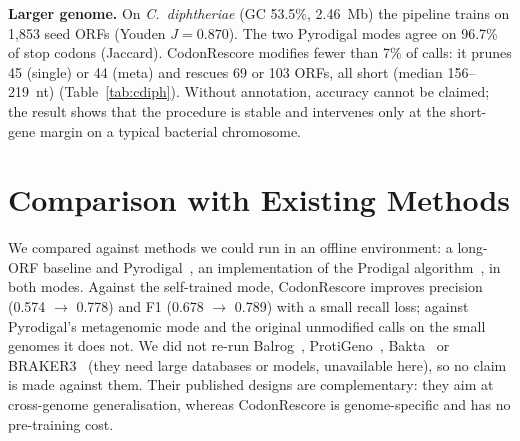 \begin{table}[t]
\caption{Threshold sensitivity (chloroplast).}\label{tab:sens}
\centering\footnotesize

\end{table}

\textbf{Larger genome.} On \textit{C.\ diphtheriae} (GC 53.5\%, 2.46~Mb) the pipeline trains on 1,853 seed ORFs (Youden $J=0.870$). The two Pyrodigal modes agree on 96.7\% of stop codons (Jaccard). CodonRescore modifies fewer than 7\% of calls: it prunes 45 (single) or 44 (meta) and rescues 69 or 103 ORFs, all short (median 156--219~nt) (Table~\ref{tab:cdiph}). Without annotation, accuracy cannot be claimed; the result shows that the procedure is stable and intervenes only at the short-gene margin on a typical bacterial chromosome.

\begin{table}[t]
\caption{CodonRescore on \textit{C.\ diphtheriae} NCTC11397 (no truth).}\label{tab:cdiph}
\centering\footnotesize
\resizebox{\linewidth}{!}{}
\end{table}

\section{Comparison with Existing Methods}
We compared against methods we could run in an offline environment: a long-ORF baseline and Pyrodigal~\cite{larralde2022}, an implementation of the Prodigal algorithm~\cite{hyatt2010}, in both modes. Against the self-trained mode, CodonRescore improves precision (0.574 $\rightarrow$ 0.778) and F1 (0.678 $\rightarrow$ 0.789) with a small recall loss; against Pyrodigal's metagenomic mode and the original unmodified calls on the small genomes it does not. We did not re-run Balrog~\cite{sommer2021}, ProtiGeno~\cite{tu2023}, Bakta~\cite{schwengers2021} or BRAKER3~\cite{gabriel2024} (they need large databases or models, unavailable here), so no claim is made against them. Their published designs are complementary: they aim at cross-genome generalisation, whereas CodonRescore is genome-specific and has no pre-training cost.

